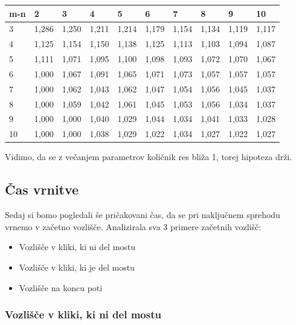 \documentclass[12pt,a4paper]{amsart}
\begin{document}
\begin{table}[!ht]
    \centering
    \begin{tabular}{|l|l|l|l|l|l|l|l|l|l|}
    \hline
        m-n & 2 & 3 & 4 & 5 & 6 & 7 & 8 & 9 & 10 \\ \hline
        3 & 1,286 & 1,250 & 1,211 & 1,214 & 1,179 & 1,154 & 1,134 & 1,119 & 1,117 \\ \hline
        4 & 1,125 & 1,154 & 1,150 & 1,138 & 1,125 & 1,113 & 1,103 & 1,094 & 1,087 \\ \hline
        5 & 1,111 & 1,071 & 1,095 & 1,100 & 1,098 & 1,093 & 1,072 & 1,070 & 1,067 \\ \hline
        6 & 1,000 & 1,067 & 1,091 & 1,065 & 1,071 & 1,073 & 1,057 & 1,057 & 1,057 \\ \hline
        7 & 1,000 & 1,062 & 1,043 & 1,062 & 1,047 & 1,054 & 1,056 & 1,045 & 1,037 \\ \hline
        8 & 1,000 & 1,059 & 1,042 & 1,061 & 1,045 & 1,053 & 1,056 & 1,034 & 1,037 \\ \hline
        9 & 1,000 & 1,000 & 1,040 & 1,029 & 1,044 & 1,034 & 1,041 & 1,033 & 1,028 \\ \hline
        10 & 1,000 & 1,000 & 1,038 & 1,029 & 1,022 & 1,034 & 1,027 & 1,022 & 1,027 \\ \hline
    \end{tabular}
\end{table}

Vidimo, da se z večanjem parametrov količnik res bliža 1, torej hipoteza drži.

\subsection{Čas vrnitve}

Sedaj si bomo pogledali še pričakovani čas, da se pri naključnem sprehodu vrnemo v začetno vozlišče.
Analizirala sva 3 primere začetnih vozlišč:
\begin{itemize}
    \item Vozlišče v kliki, ki ni del mostu
    \item Vozlišče v kliki, ki je del mostu
    \item Vozlišče na koncu poti
\end{itemize}

\subsubsection{Vozlišče v kliki, ki ni del mostu}
\end{document}
